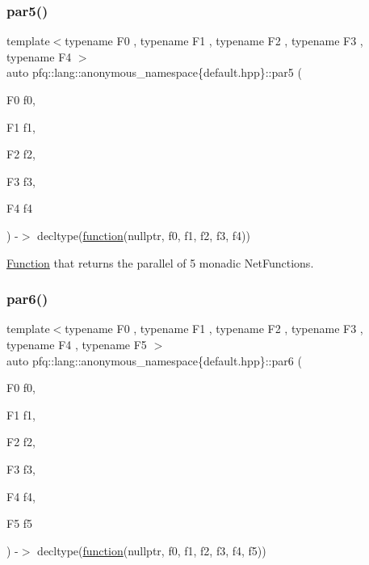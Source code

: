 \subsubsection{\texorpdfstring{par5()}{par5()}}
{\footnotesize\ttfamily template$<$typename F0 , typename F1 , typename F2 , typename F3 , typename F4 $>$ \\
auto pfq\+::lang\+::anonymous\+\_\+namespace\{default.\+hpp\}\+::par5 (\begin{DoxyParamCaption}\item[{F0}]{f0,  }\item[{F1}]{f1,  }\item[{F2}]{f2,  }\item[{F3}]{f3,  }\item[{F4}]{f4 }\end{DoxyParamCaption}) -\/$>$ decltype(\hyperlink{namespacepfq_1_1lang_a1a4638059d700ae08d0ca63886ff2bb3}{function}(nullptr, f0, f1, f2, f3, f4))
        }



\hyperlink{structpfq_1_1lang_1_1Function}{Function} that returns the parallel of 5 monadic Net\+Functions. 

\mbox{\label{namespacepfq_1_1lang_1_1anonymous__namespace_02default_8hpp_03_adb58911b28e6abe608123dbf933146ed}} 
\subsubsection{\texorpdfstring{par6()}{par6()}}
{\footnotesize\ttfamily template$<$typename F0 , typename F1 , typename F2 , typename F3 , typename F4 , typename F5 $>$ \\
auto pfq\+::lang\+::anonymous\+\_\+namespace\{default.\+hpp\}\+::par6 (\begin{DoxyParamCaption}\item[{F0}]{f0,  }\item[{F1}]{f1,  }\item[{F2}]{f2,  }\item[{F3}]{f3,  }\item[{F4}]{f4,  }\item[{F5}]{f5 }\end{DoxyParamCaption}) -\/$>$ decltype(\hyperlink{namespacepfq_1_1lang_a1a4638059d700ae08d0ca63886ff2bb3}{function}(nullptr, f0, f1, f2, f3, f4, f5))
        }



